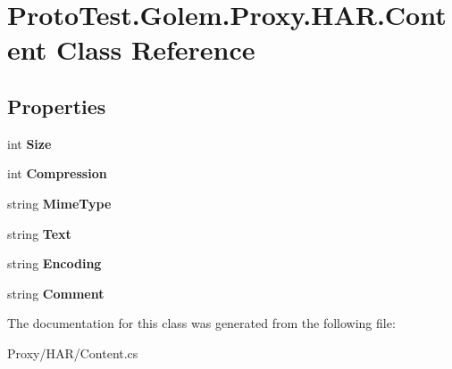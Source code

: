 \hypertarget{class_proto_test_1_1_golem_1_1_proxy_1_1_h_a_r_1_1_content}{\section{Proto\-Test.\-Golem.\-Proxy.\-H\-A\-R.\-Content Class Reference}
\label{class_proto_test_1_1_golem_1_1_proxy_1_1_h_a_r_1_1_content}
}
\subsection*{Properties}
\begin{DoxyCompactItemize}
\item 
\hypertarget{class_proto_test_1_1_golem_1_1_proxy_1_1_h_a_r_1_1_content_a9ec0ee1559fdf64afcbcf788bdbd8dfc}{int {\bfseries Size}}\label{class_proto_test_1_1_golem_1_1_proxy_1_1_h_a_r_1_1_content_a9ec0ee1559fdf64afcbcf788bdbd8dfc}

\item 
\hypertarget{class_proto_test_1_1_golem_1_1_proxy_1_1_h_a_r_1_1_content_adc60fbc6d6bd022f36644781943a5085}{int {\bfseries Compression}}\label{class_proto_test_1_1_golem_1_1_proxy_1_1_h_a_r_1_1_content_adc60fbc6d6bd022f36644781943a5085}

\item 
\hypertarget{class_proto_test_1_1_golem_1_1_proxy_1_1_h_a_r_1_1_content_af062d457455b8fb01d9db95e84212f8a}{string {\bfseries Mime\-Type}}\label{class_proto_test_1_1_golem_1_1_proxy_1_1_h_a_r_1_1_content_af062d457455b8fb01d9db95e84212f8a}

\item 
\hypertarget{class_proto_test_1_1_golem_1_1_proxy_1_1_h_a_r_1_1_content_a2cbeca3f08b378dfe094b5c1c076c67e}{string {\bfseries Text}}\label{class_proto_test_1_1_golem_1_1_proxy_1_1_h_a_r_1_1_content_a2cbeca3f08b378dfe094b5c1c076c67e}

\item 
\hypertarget{class_proto_test_1_1_golem_1_1_proxy_1_1_h_a_r_1_1_content_aff969d060cc7f4c6a68e90dd0a043dd3}{string {\bfseries Encoding}}\label{class_proto_test_1_1_golem_1_1_proxy_1_1_h_a_r_1_1_content_aff969d060cc7f4c6a68e90dd0a043dd3}

\item 
\hypertarget{class_proto_test_1_1_golem_1_1_proxy_1_1_h_a_r_1_1_content_ae977f8d1063a050aedb21221a34fde28}{string {\bfseries Comment}}\label{class_proto_test_1_1_golem_1_1_proxy_1_1_h_a_r_1_1_content_ae977f8d1063a050aedb21221a34fde28}

\end{DoxyCompactItemize}


The documentation for this class was generated from the following file\-:\begin{DoxyCompactItemize}
\item 
Proxy/\-H\-A\-R/Content.\-cs\end{DoxyCompactItemize}
